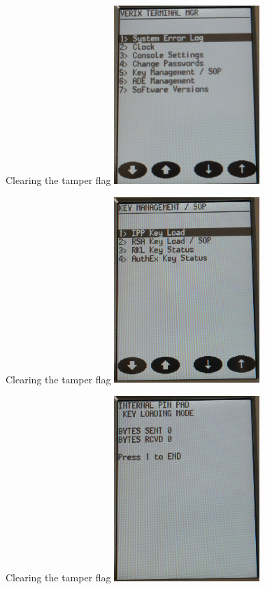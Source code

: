 \documentclass[12pt,aspectratio=169]{beamer}
\begin{document}
\begin{frame}{Clearing the tamper flag}
\centering
\includegraphics[width=5.5cm]{media/lcd_tamper3}
\end{frame}

\begin{frame}{Clearing the tamper flag}
\centering
\includegraphics[width=5.5cm]{media/lcd_tamper5}
\end{frame}

\begin{frame}{Clearing the tamper flag}
\centering
\includegraphics[width=5.5cm]{media/lcd_tamper6}
\end{frame}
\end{document}
